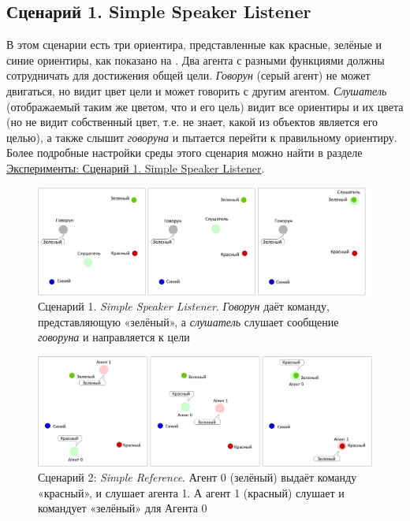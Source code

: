 \subsection{Сценарий 1. Simple Speaker Listener} \label{intro:ssl}

В этом сценарии есть три ориентира, представленные как красные, зелёные и синие ориентиры, как показано на . Два агента с разными функциями должны сотрудничать для достижения общей цели. \textit{Говорун} (серый агент) не может двигаться, но видит цвет цели и может говорить с другим агентом. \textit{Слушатель} (отображаемый таким же цветом, что и его цель) видит все ориентиры и их цвета (но не видит собственный цвет, т.е. не знает, какой из объектов является его целью), а также слышит \textit{говоруна} и пытается перейти к правильному ориентиру. Более подробные настройки среды этого сценария можно найти в разделе \hyperref[exp-ssl]{Эксперименты: Сценарий 1. Simple Speaker Listener}.

\begin{figure}[ht!]
    \center
    \includegraphics [scale=0.41] {my_folder/images/intro/ssl.png}
    \caption{Сценарий 1. \textit{Simple Speaker Listener}. \textit{Говорун} даёт команду, представляющую «зелёный», а \textit{слушатель} слушает сообщение \textit{говоруна} и направляется к цели}
    \label{fig-intro-ssl}
\end{figure}

\begin{figure}[ht!]
    \center
    \includegraphics [scale=0.38] {my_folder/images/intro/sr.png}
    \caption{Сценарий 2: \textit{Simple Reference}. Агент 0 (зелёный) выдаёт команду «красный», и слушает агента 1. А агент 1 (красный) слушает и командует «зелёный» для Агента 0}
    \label{fig-intro-sr}
\end{figure}

